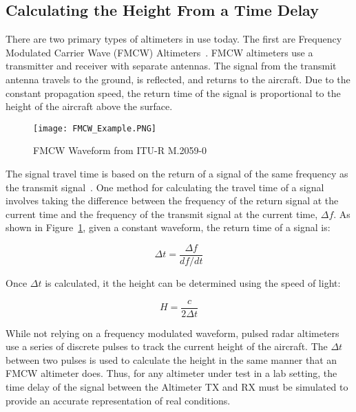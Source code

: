 \subsection{Calculating the Height From a Time Delay}
There are two primary types of altimeters in use today. The first are Frequency Modulated Carrier Wave (FMCW) Altimeters~\cite{noauthor_operational_2014}. FMCW altimeters use a transmitter and receiver with separate antennas. The signal from the transmit antenna travels to the ground, is reflected, and returns to the aircraft. Due to the constant propagation speed, the return time of the signal is proportional to the height of the aircraft above the surface. 


\begin{figure}
 \centering
 \texttt{[image: FMCW\_Example.PNG]}
 \caption{FMCW Waveform from ITU-R M.2059-0 ~\cite{noauthor_operational_2014}}
 \label{fig:FMCW}
\end{figure}
The signal travel time is based on the return of a signal of the same frequency as the transmit signal~\cite{noauthor_operational_2014}. One method for calculating the travel time of a signal involves taking the difference between the frequency of the return signal at the current time and the frequency of the transmit signal at the current time, $\Delta f$. As shown in Figure~\ref{fig:FMCW}, given a constant waveform, the return time of a signal is:

$$\Delta t = \frac{\Delta f}{df/dt}$$

Once $\Delta t$ is calculated, it the height can be determined using the speed of light: 

$$H = \frac{c}{2\Delta t} $$

While not relying on a frequency modulated waveform, pulsed radar altimeters use a series of discrete pulses to track the current height of the aircraft. The $\Delta t$ between two pulses is used to calculate the height in the same manner that an FMCW altimeter does. Thus, for any altimeter under test in a lab setting, the time delay of the signal between the Altimeter TX and RX must be simulated to provide an accurate representation of real conditions. 
